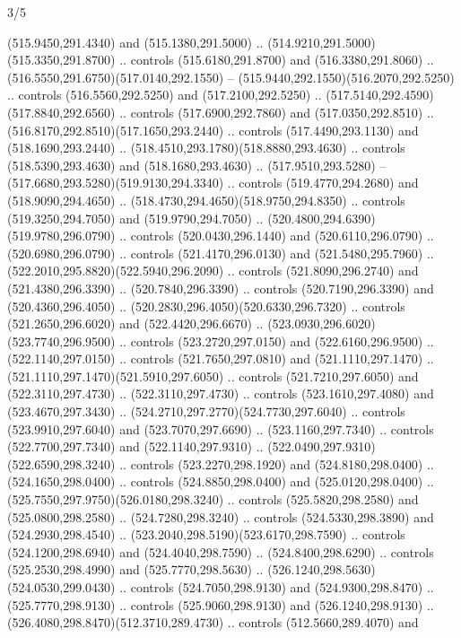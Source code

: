 \begin{flagdescription}{3/5}
\begin{scope}[shift={(0.5\flaglength,0.5\flagwidth)},scale=\flagwidth/1075]
\begin{scope}[y=0.80pt, x=0.80pt, yscale=-2.37, xscale=2.37,xshift=-402,yshift=-230.4]
  (515.9450,291.4340) and (515.1380,291.5000) ..
  (514.9210,291.5000)(515.3350,291.8700) .. controls (515.6180,291.8700) and
  (516.3380,291.8060) .. (516.5550,291.6750)(517.0140,292.1550) --
  (515.9440,292.1550)(516.2070,292.5250) .. controls (516.5560,292.5250) and
  (517.2100,292.5250) .. (517.5140,292.4590)(517.8840,292.6560) .. controls
  (517.6900,292.7860) and (517.0350,292.8510) ..
  (516.8170,292.8510)(517.1650,293.2440) .. controls (517.4490,293.1130) and
  (518.1690,293.2440) .. (518.4510,293.1780)(518.8880,293.4630) .. controls
  (518.5390,293.4630) and (518.1680,293.4630) .. (517.9510,293.5280) --
  (517.6680,293.5280)(519.9130,294.3340) .. controls (519.4770,294.2680) and
  (518.9090,294.4650) .. (518.4730,294.4650)(518.9750,294.8350) .. controls
  (519.3250,294.7050) and (519.9790,294.7050) ..
  (520.4800,294.6390)(519.9780,296.0790) .. controls (520.0430,296.1440) and
  (520.6110,296.0790) .. (520.6980,296.0790) .. controls (521.4170,296.0130) and
  (521.5480,295.7960) .. (522.2010,295.8820)(522.5940,296.2090) .. controls
  (521.8090,296.2740) and (521.4380,296.3390) .. (520.7840,296.3390) .. controls
  (520.7190,296.3390) and (520.4360,296.4050) ..
  (520.2830,296.4050)(520.6330,296.7320) .. controls (521.2650,296.6020) and
  (522.4420,296.6670) .. (523.0930,296.6020)(523.7740,296.9500) .. controls
  (523.2720,297.0150) and (522.6160,296.9500) .. (522.1140,297.0150) .. controls
  (521.7650,297.0810) and (521.1110,297.1470) ..
  (521.1110,297.1470)(521.5910,297.6050) .. controls (521.7210,297.6050) and
  (522.3110,297.4730) .. (522.3110,297.4730) .. controls (523.1610,297.4080) and
  (523.4670,297.3430) .. (524.2710,297.2770)(524.7730,297.6040) .. controls
  (523.9910,297.6040) and (523.7070,297.6690) .. (523.1160,297.7340) .. controls
  (522.7700,297.7340) and (522.1140,297.9310) ..
  (522.0490,297.9310)(522.6590,298.3240) .. controls (523.2270,298.1920) and
  (524.8180,298.0400) .. (524.1650,298.0400) .. controls (524.8850,298.0400) and
  (525.0120,298.0400) .. (525.7550,297.9750)(526.0180,298.3240) .. controls
  (525.5820,298.2580) and (525.0800,298.2580) .. (524.7280,298.3240) .. controls
  (524.5330,298.3890) and (524.2930,298.4540) ..
  (523.2040,298.5190)(523.6170,298.7590) .. controls (524.1200,298.6940) and
  (524.4040,298.7590) .. (524.8400,298.6290) .. controls (525.2530,298.4990) and
  (525.7770,298.5630) .. (526.1240,298.5630)(524.0530,299.0430) .. controls
  (524.7050,298.9130) and (524.9300,298.8470) .. (525.7770,298.9130) .. controls
  (525.9060,298.9130) and (526.1240,298.9130) ..
  (526.4080,298.8470)(512.3710,289.4730) .. controls (512.5660,289.4070) and

\end{scope}
\end{scope}
\end{flagdescription}
